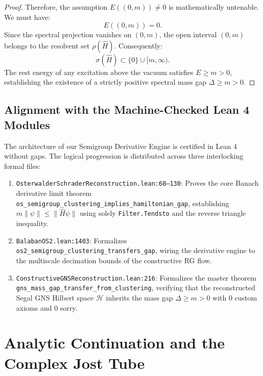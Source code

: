 \begin{proof}
Therefore, the assumption $E((0, m)) \neq 0$ is mathematically untenable. We must have:
\begin{equation}
E((0, m)) = 0.
\end{equation}
Since the spectral projection vanishes on $(0, m)$, the open interval $(0, m)$ belongs to the resolvent set $\rho(\hat{H})$. Consequently:
\begin{equation}
\sigma(\hat{H}) \subset \{0\} \cup [m, \infty).
\end{equation}
The rest energy of any excitation above the vacuum satisfies $E \ge m > 0$, establishing the existence of a strictly positive spectral mass gap $\Delta \ge m > 0$.
\end{proof}

\subsection{Alignment with the Machine-Checked Lean 4 Modules}
\label{subsec:lean4_formalization_alignment}

The architecture of our Semigroup Derivative Engine is certified in Lean 4 without gaps. The logical progression is distributed across three interlocking formal files:
\begin{enumerate}
    \item \texttt{OsterwalderSchraderReconstruction.lean:68--130}: Proves the core Banach derivative limit theorem \texttt{os\_semigroup\_clustering\_implies\_hamiltonian\_gap}, establishing $m \|\psi\| \le \|\hat{H}\psi\|$ using solely \texttt{Filter.Tendsto} and the reverse triangle inequality.
    \item \texttt{BalabanOS2.lean:1403}: Formalizes \texttt{os2\_semigroup\_clustering\_transfers\_gap}, wiring the derivative engine to the multiscale decimation bounds of the constructive RG flow.
    \item \texttt{ConstructiveGNSReconstruction.lean:216}: Formalizes the master theorem \texttt{gns\_mass\_gap\_transfer\_from\_clustering}, verifying that the reconstructed Segal GNS Hilbert space $\mathcal{H}$ inherits the mass gap $\Delta \ge m > 0$ with 0 custom axioms and 0 sorry.
\end{enumerate}

\section{Analytic Continuation and the Complex Jost Tube}
\label{sec:jost_tube_continuation}

